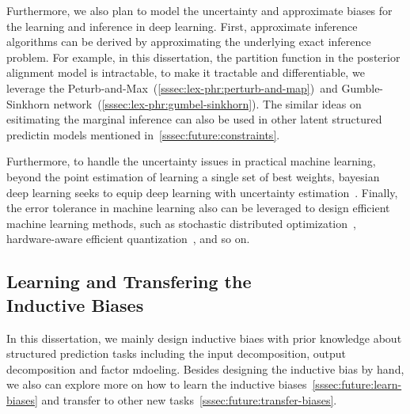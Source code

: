 Furthermore, we also plan to model the uncertainty and approximate
biases for the learning and inference in deep learning. First,
approximate inference algorithms can be derived by approximating the
underlying exact inference problem. For example, in this dissertation,
the partition function in the posterior alignment model is
intractable, to make it tractable and differentiable, we leverage the
Peturb-and-Max~(\autoref{sssec:lex-phr:perturb-and-map})~and
Gumble-Sinkhorn network~(\autoref{sssec:lex-phr:gumbel-sinkhorn}). The
similar ideas on esitimating the marginal inference can also be used
in other latent structured predictin models mentioned
in~\autoref{sssec:future:constraints}.

Furthermore, to handle the uncertainty issues in practical machine
learning, beyond the point estimation of learning a single set of best
weights, bayesian deep learning seeks to equip deep learning with
uncertainty estimation~\citep{wang2020survey}. Finally, the error
tolerance in machine learning also can be leveraged to design
efficient machine learning methods, such as stochastic distributed
optimization~\cite{assran2019stochastic}, hardware-aware efficient
quantization~\citep{huang2022sdq}, and so on.

\subsection[Learning and Transfering the Inductive Biases]{Learning and Transfering the \\Inductive Biases}
\label{ssec:future:bias-learn-transfer}
In this dissertation, we mainly design inductive biaes with prior knowledge
about structured prediction tasks including the input decomposition,
output decomposition and factor mdoeling. Besides designing the
inductive bias by hand, we also can explore more on how to learn the
inductive biases~\autoref{sssec:future:learn-biases} and transfer to
other new tasks~\autoref{sssec:future:transfer-biases}.


